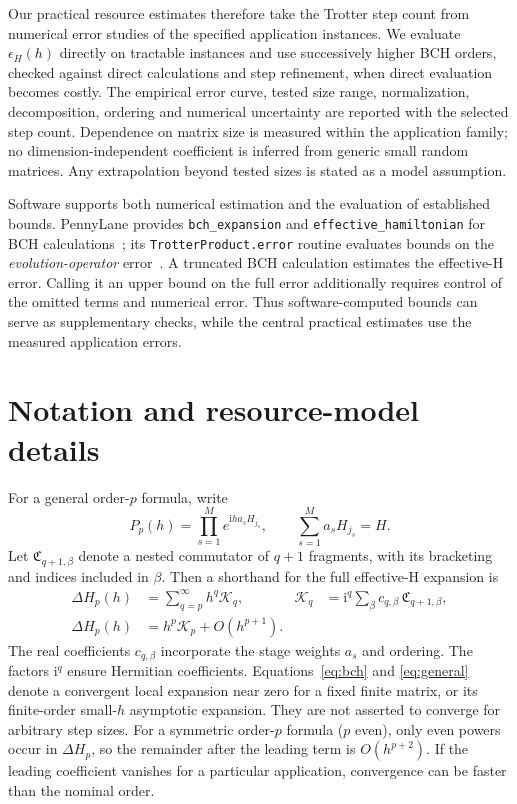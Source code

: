 Our practical resource estimates therefore take the Trotter step count from numerical error studies of the specified application instances. We evaluate $\epsilon_H(h)$ directly on tractable instances and use successively higher BCH orders, checked against direct calculations and step refinement, when direct evaluation becomes costly. The empirical error curve, tested size range, normalization, decomposition, ordering and numerical uncertainty are reported with the selected step count. Dependence on matrix size is measured within the application family; no dimension-independent coefficient is inferred from generic small random matrices. Any extrapolation beyond tested sizes is stated as a model assumption.

Software supports both numerical estimation and the evaluation of established bounds. PennyLane provides \texttt{bch\_expansion} and \texttt{effective\_hamiltonian} for BCH calculations~\cite{plbch,pleffective}; its \texttt{TrotterProduct.error} routine evaluates bounds on the \emph{evolution-operator} error~\cite{plbound}. A truncated BCH calculation estimates the effective-H error. Calling it an upper bound on the full error additionally requires control of the omitted terms and numerical error. Thus software-computed bounds can serve as supplementary checks, while the central practical estimates use the measured application errors.

\section{Notation and resource-model details}
For a general order-$p$ formula, write
\begin{equation}
 P_p(h)=\prod_{s=1}^{M}e^{\mathrm{i}h a_s H_{j_s}},\qquad
 \sum_{s=1}^{M}a_sH_{j_s}=H.
\end{equation}
Let $\mathfrak C_{q+1,\beta}$ denote a nested commutator of $q+1$ fragments, with its bracketing and indices included in $\beta$. Then a shorthand for the full effective-H expansion is
\begin{align}
 \Delta H_p(h)&=\sum_{q=p}^{\infty}h^q\mathcal K_q,
 &\mathcal K_q&=\mathrm{i}^{q}\sum_{\beta}c_{q,\beta}\,
                         \mathfrak C_{q+1,\beta},\label{eq:general}\\
 \Delta H_p(h)&=h^p\mathcal K_p+O(h^{p+1}).
\end{align}
The real coefficients $c_{q,\beta}$ incorporate the stage weights $a_s$ and ordering. The factors $\mathrm{i}^q$ ensure Hermitian coefficients. Equations~\eqref{eq:bch} and \eqref{eq:general} denote a convergent local expansion near zero for a fixed finite matrix, or its finite-order small-$h$ asymptotic expansion. They are not asserted to converge for arbitrary step sizes. For a symmetric order-$p$ formula ($p$ even), only even powers occur in $\Delta H_p$, so the remainder after the leading term is $O(h^{p+2})$. If the leading coefficient vanishes for a particular application, convergence can be faster than the nominal order.


